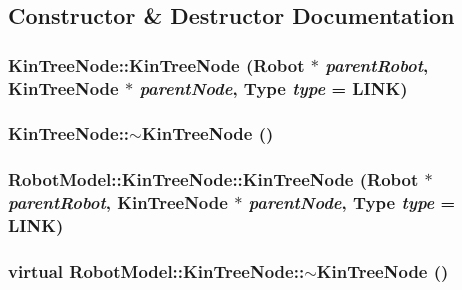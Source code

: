\subsection{Constructor \& Destructor Documentation}
\hypertarget{class_robot_model_1_1_kin_tree_node_a48236a64352c2187db6193069d598c86}{
\subsubsection[{KinTreeNode}]{\setlength{\rightskip}{0pt plus 5cm}KinTreeNode::KinTreeNode ({\bf Robot} $\ast$ {\em parentRobot}, \/  {\bf KinTreeNode} $\ast$ {\em parentNode}, \/  {\bf Type} {\em type} = {\ttfamily LINK})}}
\label{class_robot_model_1_1_kin_tree_node_a48236a64352c2187db6193069d598c86}
\hypertarget{class_robot_model_1_1_kin_tree_node_a629cf524084ee233b402674cb371195f}{
\subsubsection[{$\sim$KinTreeNode}]{\setlength{\rightskip}{0pt plus 5cm}KinTreeNode::$\sim$KinTreeNode ()}}
\label{class_robot_model_1_1_kin_tree_node_a629cf524084ee233b402674cb371195f}
\hypertarget{class_robot_model_1_1_kin_tree_node_a0ee910d623799e97855e387b052cb83a}{
\subsubsection[{KinTreeNode}]{\setlength{\rightskip}{0pt plus 5cm}RobotModel::KinTreeNode::KinTreeNode ({\bf Robot} $\ast$ {\em parentRobot}, \/  {\bf KinTreeNode} $\ast$ {\em parentNode}, \/  {\bf Type} {\em type} = {\ttfamily LINK})}}
\label{class_robot_model_1_1_kin_tree_node_a0ee910d623799e97855e387b052cb83a}
\hypertarget{class_robot_model_1_1_kin_tree_node_acff03d8aed8a974e50082449f289992c}{
\subsubsection[{$\sim$KinTreeNode}]{\setlength{\rightskip}{0pt plus 5cm}virtual RobotModel::KinTreeNode::$\sim$KinTreeNode ()}}
\label{class_robot_model_1_1_kin_tree_node_acff03d8aed8a974e50082449f289992c}


